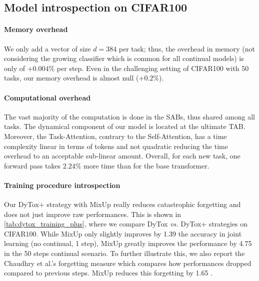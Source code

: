 \subsection{Model introspection on CIFAR100}

\paragraph{Memory overhead}
We only add a vector of size $d=384$ per task; thus, the overhead in memory (not considering the
growing classifier which is common for all continual models) is only of $+0.004\%$ per step. Even in
the challenging setting of CIFAR100 with 50 tasks, our memory overhead is almost null ($+0.2\%$).

\label{sec:dytox_comp_over}
\vspace{-1em}
\paragraph{Computational overhead} The vast majority of the computation is done in the SABs, thus
shared among all tasks. The dynamical component of our model is located at the ultimate TAB.
Moreover, the Task-Attention, contrary to the Self-Attention, has a time complexity linear in terms
of tokens and not quadratic reducing the time overhead to an acceptable sub-linear amount. Overall,
for each new task, one forward pass takes $2.24\%$ more time than for the base transformer.

\vspace{-1em}


\paragraph{Training procedure introspection} Our DyTox+ strategy with MixUp really reduces
catastrophic forgetting and does not just improve raw performances. This is shown in
\autoref{tab:dytox_training_plus}, where we compare DyTox \textit{vs.} DyTox+ strategies on CIFAR100.
While MixUp only slightly improves by 1.39 \pp the accuracy in joint learning (no continual, 1
step), MixUp greatly improves the performance by 4.75 \pp in the 50 steps continual scenario. To
further illustrate this, we also report the Chaudhry et al.'s forgetting
\citep{chaudhry2018riemannien_walk} measure which compares how performances dropped compared to
previous steps. MixUp reduces this forgetting by 1.65 \pp.

\vspace{-1em}
\label{sec:dytox_ablations}
